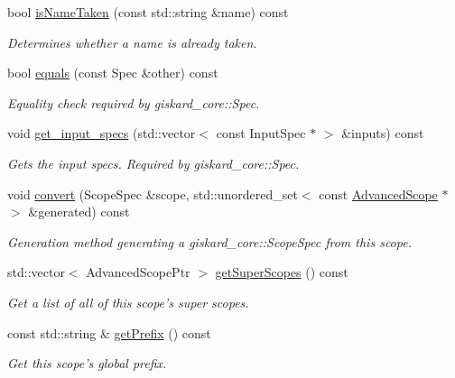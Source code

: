\begin{DoxyCompactItemize}
bool \hyperlink{classgiskard__suturo_1_1AdvancedScope_af1e4c6fa16b5ee78fcc58c17a8b0dfeb}{is\-Name\-Taken} (const std\-::string \&name) const 
\begin{DoxyCompactList}\small\item\em Determines whether a name is already taken. \end{DoxyCompactList}\item 
bool \hyperlink{classgiskard__suturo_1_1AdvancedScope_a5bc06fbeb129fe8955f66a468dcf4b63}{equals} (const Spec \&other) const 
\begin{DoxyCompactList}\small\item\em Equality check required by giskard\-\_\-core\-::\-Spec. \end{DoxyCompactList}\item 
void \hyperlink{classgiskard__suturo_1_1AdvancedScope_a618f025a37c10a1e5daedbe7552b29ea}{get\-\_\-input\-\_\-specs} (std\-::vector$<$ const Input\-Spec $\ast$ $>$ \&inputs) const 
\begin{DoxyCompactList}\small\item\em Gets the input specs. Required by giskard\-\_\-core\-::\-Spec. \end{DoxyCompactList}\item 
void \hyperlink{classgiskard__suturo_1_1AdvancedScope_a7fde68d72d367aeb8cdda1fff7b39fbe}{convert} (Scope\-Spec \&scope, std\-::unordered\-\_\-set$<$ const \hyperlink{classgiskard__suturo_1_1AdvancedScope}{Advanced\-Scope} $\ast$ $>$ \&generated) const 
\begin{DoxyCompactList}\small\item\em Generation method generating a giskard\-\_\-core\-::\-Scope\-Spec from this scope. \end{DoxyCompactList}\item 
std\-::vector$<$ Advanced\-Scope\-Ptr $>$ \hyperlink{classgiskard__suturo_1_1AdvancedScope_a617f245bf85101b329f02b1bbbb36adf}{get\-Super\-Scopes} () const 
\begin{DoxyCompactList}\small\item\em Get a list of all of this scope's super scopes. \end{DoxyCompactList}\item 
const std\-::string \& \hyperlink{classgiskard__suturo_1_1AdvancedScope_aaa72dd5b730fd5d97d25f9c4ed902630}{get\-Prefix} () const 
\begin{DoxyCompactList}\small\item\em Get this scope's global prefix. \end{DoxyCompactList}\end{DoxyCompactItemize}
